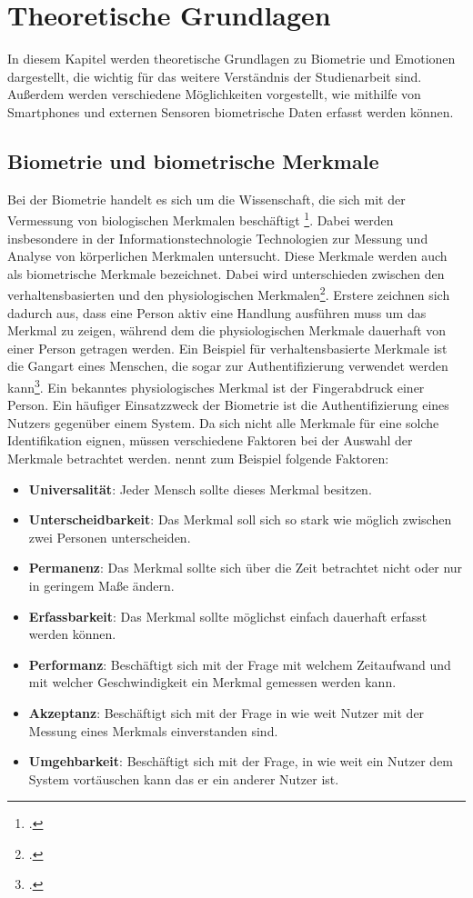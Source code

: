 \section{Theoretische Grundlagen}
In diesem Kapitel werden theoretische Grundlagen zu Biometrie und Emotionen dargestellt, die wichtig für das weitere Verständnis der Studienarbeit sind. Außerdem werden verschiedene Möglichkeiten vorgestellt, wie mithilfe von Smartphones und externen Sensoren biometrische Daten erfasst werden können.
\subsection{Biometrie und biometrische Merkmale}
\label{section:Biometrie}
Bei der Biometrie handelt es sich um die Wissenschaft, die sich mit der Vermessung von biologischen Merkmalen beschäftigt \footcite[Vgl.][]{Sea18}. Dabei werden insbesondere in der Informationstechnologie Technologien zur Messung und Analyse von körperlichen Merkmalen untersucht.\newline
Diese Merkmale werden auch als biometrische Merkmale bezeichnet. Dabei wird unterschieden zwischen den verhaltensbasierten und den physiologischen Merkmalen\footcite[Vgl. ][]{Sas06}. Erstere zeichnen sich dadurch aus, dass eine Person aktiv eine Handlung ausführen muss um das Merkmal zu zeigen, während dem die physiologischen Merkmale dauerhaft von einer Person getragen werden. Ein Beispiel für verhaltensbasierte Merkmale ist die Gangart eines Menschen, die sogar zur Authentifizierung verwendet werden kann\footcite[Vgl. ][]{Cla09}. Ein bekanntes physiologisches Merkmal ist der Fingerabdruck einer Person.\newline
Ein häufiger Einsatzzweck der Biometrie ist die Authentifizierung eines Nutzers gegenüber einem System. Da sich nicht alle Merkmale für eine solche Identifikation eignen, müssen verschiedene Faktoren bei der Auswahl der Merkmale betrachtet werden. \cite{Akj04} nennt zum Beispiel folgende Faktoren: 
\begin{itemize}
	\item \textbf{Universalität}: Jeder Mensch sollte dieses Merkmal besitzen.
	\item \textbf{Unterscheidbarkeit}: Das Merkmal soll sich so stark wie möglich zwischen zwei Personen unterscheiden.
	\item \textbf{Permanenz}: Das Merkmal sollte sich über die Zeit betrachtet nicht oder nur in geringem Maße ändern.
	\item \textbf{Erfassbarkeit}: Das Merkmal sollte möglichst einfach dauerhaft erfasst werden können.
	\item \textbf{Performanz}: Beschäftigt sich mit der Frage mit welchem Zeitaufwand und mit welcher Geschwindigkeit ein Merkmal gemessen werden kann. 
	\item \textbf{Akzeptanz}: Beschäftigt sich mit der Frage in wie weit Nutzer mit der Messung eines Merkmals einverstanden sind. 
	\item \textbf{Umgehbarkeit}: Beschäftigt sich mit der Frage, in wie weit ein Nutzer dem System vortäuschen kann das er ein anderer Nutzer ist.
\end{itemize}
